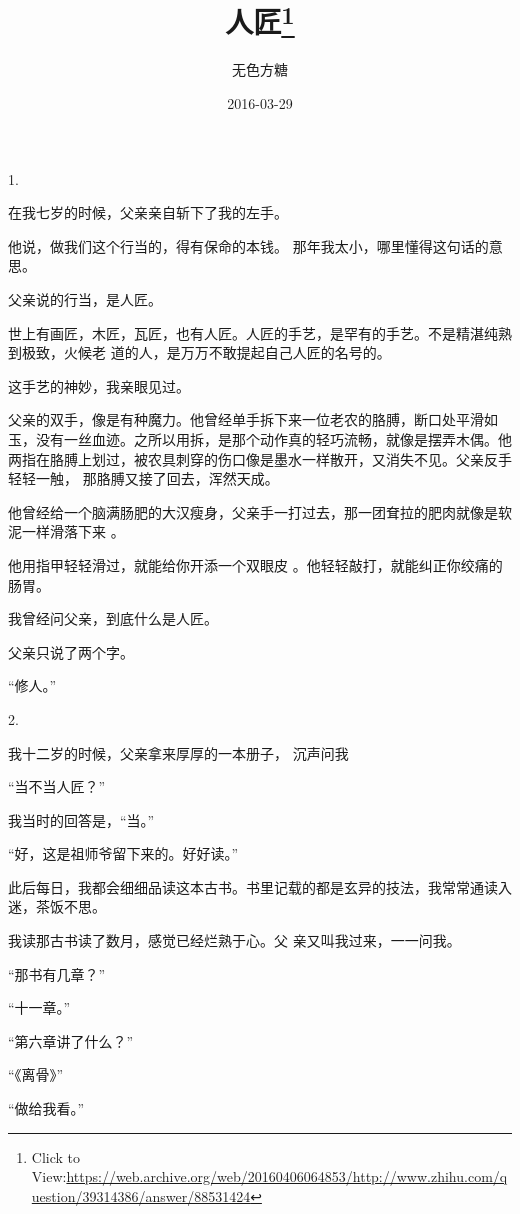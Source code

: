 \documentclass{article}
\title{人匠\footnote{Click to View:\url{https://web.archive.org/web/20160406064853/http://www.zhihu.com/question/39314386/answer/88531424}}}
\author{无色方糖}
\date{2016-03-29}
\begin{document}

\maketitle


\Large


﻿1. 

在我七岁的时候，父亲亲自斩下了我的左手。
 

他说，做我们这个行当的，得有保命的本钱。
那年我太小，哪里懂得这句话的意思。 


父亲说的行当，是人匠。 

世上有画匠，木匠，瓦匠，也有人匠。人匠的手艺，是罕有的手艺。不是精湛纯熟到极致，火候老
道的人，是万万不敢提起自己人匠的名号的。 


\newpage

这手艺的神妙，我亲眼见过。 

父亲的双手，像是有种魔力。他曾经单手拆下来一位老农的胳膊，断口处平滑如玉，没有一丝血迹。之所以用拆，是那个动作真的轻巧流畅，就像是摆弄木偶。他两指在胳膊上划过，被农具刺穿的伤口像是墨水一样散开，又消失不见。父亲反手轻轻一触，
那胳膊又接了回去，浑然天成。 

他曾经给一个脑满肠肥的大汉瘦身，父亲手一打过去，那一团耷拉的肥肉就像是软泥一样滑落下来
。 

他用指甲轻轻滑过，就能给你开添一个双眼皮
。他轻轻敲打，就能纠正你绞痛的肠胃。 


我曾经问父亲，到底什么是人匠。 


父亲只说了两个字。 


“修人。” 

\newpage


2. 

我十二岁的时候，父亲拿来厚厚的一本册子，
沉声问我 


“当不当人匠？” 


我当时的回答是，“当。” 


“好，这是祖师爷留下来的。好好读。” 

此后每日，我都会细细品读这本古书。书里记载的都是玄异的技法，我常常通读入迷，茶饭不思。

我读那古书读了数月，感觉已经烂熟于心。父
亲又叫我过来，一一问我。 


“那书有几章？” 


“十一章。” 

\newpage


“第六章讲了什么？” 


“《离骨》” 


“做给我看。” 
\end{document}
